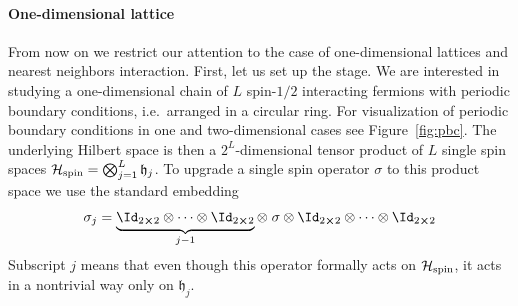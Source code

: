 \paragraph{One-dimensional lattice}From now on we restrict our attention to the case of one-dimensional lattices and
nearest neighbors interaction. First, let us set up the stage. We are interested in studying
a one-dimensional chain of \(L\) spin-\(1/2\) interacting fermions with periodic boundary conditions,
i.e.\ arranged in a circular ring. For visualization of periodic boundary conditions in 
one and two-dimensional cases see Figure~\ref{fig:pbc}.
The underlying Hilbert space is then a \(2^L\)-dimensional
tensor product of \(L\) single spin spaces \(\mathcal{H}_{\textrm{spin}} = \bigotimes_{j=1}^{L}\mathfrak{h}_j\).
To upgrade a single spin operator \(\sigma\) to this product space we use the
standard embedding~\autocite{Ng2011HeisenbergM}
\begin{equation}
    \sigma_j = \underbrace{\Id_{2\cross 2} \otimes \cdots \otimes \Id_{2\cross 2}}_{j-1}
     \otimes \;\sigma \otimes \Id_{2\cross 2} \otimes \cdots \otimes \Id_{2\cross 2}
    \label{eq:embedding}
\end{equation}
Subscript \(j\) means that even though this operator formally acts on
\(\mathcal{H}_{\textrm{spin}}\), it acts in a nontrivial way only on \(\mathfrak{h}_j\). 

